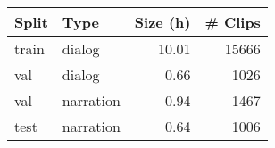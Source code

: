 \begin{tabular}{llrr}
	\toprule
	Split &      Type &  Size (h) &  \# Clips \\
	\midrule
	train &    dialog &     10.01 &    15666 \\
	val &    dialog &      0.66 &     1026 \\
	val & narration &      0.94 &     1467 \\
	test & narration &      0.64 &     1006 \\
	\bottomrule
\end{tabular}
